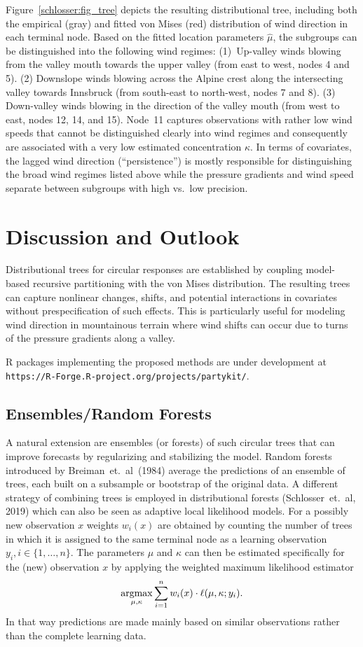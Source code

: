 \documentclass[twoside]{report}
\begin{document}
Figure~\ref{schlosser:fig_tree} depicts the resulting distributional tree, including
both the empirical (gray) and fitted von Mises (red) distribution of wind direction
in each terminal node. Based on the fitted location parameters $\hat \mu$, the subgroups
can be distinguished into the following wind regimes:
(1)~Up-valley winds blowing from the valley mouth towards the upper valley
(from east to west, nodes 4 and 5). (2) Downslope winds blowing across
the Alpine crest along the intersecting valley towards Innsbruck (from south-east to
north-west, nodes 7 and 8). (3) Down-valley winds blowing in the direction
of the valley mouth (from west to east, nodes 12, 14, and 15). Node~11
captures observations with rather low wind speeds that cannot be distinguished
clearly into wind regimes and consequently are associated with a very low
estimated concentration $\hat \kappa$. In terms of covariates, the lagged
wind direction (``persistence'') is mostly responsible for distinguishing
the broad wind regimes listed above while the pressure gradients and wind
speed separate between subgroups with high vs.\ low precision.

\section{Discussion and Outlook}

Distributional trees for circular responses are established by coupling
model-based recursive partitioning with the von Mises distribution.
The resulting trees can capture nonlinear changes, shifts, and potential interactions
in covariates without prespecification of such effects. This is particularly
useful for modeling wind direction in mountainous terrain where wind shifts
can occur due to turns of the pressure gradients along a valley.

\textsf{R} packages implementing the proposed methods are under development at
\texttt{https://R-Forge.R-project.org/projects/partykit/}.

\subsection{Ensembles/Random Forests}
A natural extension are ensembles (or forests) of such circular trees
that can improve forecasts by regularizing and stabilizing the model.
Random forests introduced by Breiman~et.~al~(1984) average the
predictions of an ensemble of trees, each built on a subsample 
or bootstrap of the original data. 
A different strategy of combining trees is employed in distributional forests 
(Schlosser~et.~al, 2019) which can also be seen as adaptive local likelihood models. 
For a possibly new observation $x$ weights $w_i(x)$ are obtained by counting the 
number of trees in which it is assigned to the same terminal node as a learning
observation $y_i, i \in \{1,\ldots,n\}$.
The parameters $\mu$ and $\kappa$ can then be estimated specifically for the (new) 
observation $x$ by applying the weighted maximum likelihood estimator
$$
\operatorname{argmax}\displaylimits_{\mu, \kappa} \sum_{i=1}^n w_i(x) \cdot \ell(\mu, \kappa; y_i). 
$$
In that way predictions are made mainly based on similar observations rather than the 
complete learning data.
\end{document}

